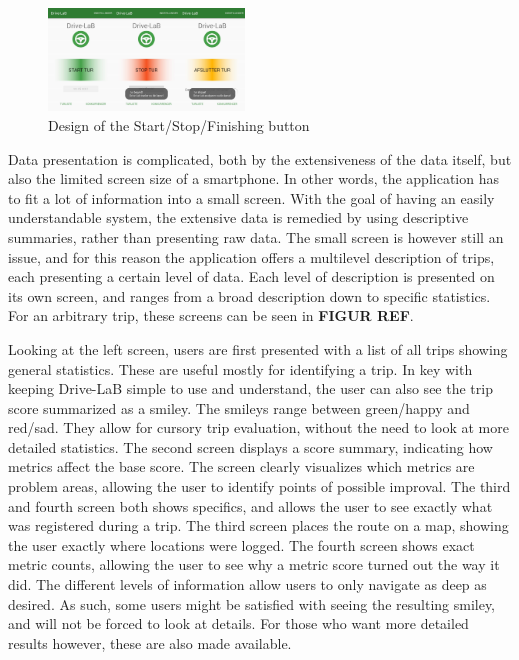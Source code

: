 \begin{figure}[tb]
\centering
\includegraphics[width=0.465\textwidth]{Pictures/start_stop_finishing_trip}
\caption{Design of the Start/Stop/Finishing button}
\label{fig:start_stop_finishing_trip}
\end{figure}

Data presentation is complicated, both by the extensiveness of the data itself, but also the limited screen size of a smartphone. In other words, the application has to fit a lot of information into a small screen. With the goal of having an easily understandable system, the extensive data is remedied by using descriptive summaries, rather than presenting raw data. The small screen is however still an issue, and for this reason the application offers a multilevel description of trips, each presenting a certain level of data. Each level of description is presented on its own screen, and ranges from a broad description down to specific statistics. For an arbitrary trip, these screens can be seen in \textbf{FIGUR REF}.

Looking at the left screen, users are first presented with a list of all trips showing general statistics. These are useful mostly for identifying a trip. In key with keeping Drive-LaB simple to use and understand, the user can also see the trip score summarized as a smiley. The smileys range between green/happy and red/sad. They allow for cursory trip evaluation, without the need to look at more detailed statistics.
The second screen displays a score summary, indicating how metrics affect the base score. The screen clearly visualizes which metrics are problem areas, allowing the user to identify points of possible improval.
The third and fourth screen both shows specifics, and allows the user to see exactly what was registered during a trip. The third screen places the route on a map, showing the user exactly where locations were logged. The fourth screen shows exact metric counts, allowing the user to see why a metric score turned out the way it did.
The different levels of information allow users to only navigate as deep as desired. As such, some users might be satisfied with seeing the resulting smiley, and will not be forced to look at details. For those who want more detailed results however, these are also made available.
